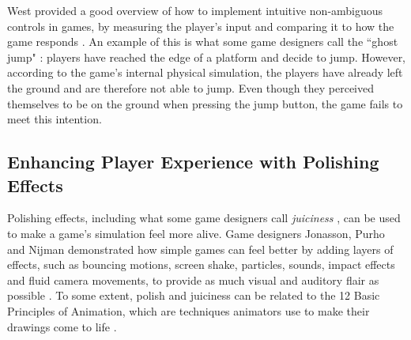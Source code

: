 
West provided a good overview of how to implement intuitive non-ambiguous controls in games, by measuring the player's input and comparing it to how the game responds \cite{intuitive_buttons}. An example of this is what some game designers call the ``ghost jump" \cite{ghostJump, canabalt}: players have reached the edge of a platform and decide to jump. However, according to the game's internal physical simulation, the players have already left the ground and are therefore not able to jump. Even though they perceived themselves to be on the ground when pressing the jump button, the game fails to meet this intention.

\subsection{Enhancing Player Experience with Polishing Effects} \label{polishSection}
Polishing effects, including what some game designers call \textit{juiciness} \cite{schell_art_2008}, can be used to make a game's simulation feel more alive. Game designers Jonasson, Purho and Nijman demonstrated how simple games can feel better by adding layers of effects, such as bouncing motions, screen shake, particles, sounds, impact effects and fluid camera movements, to provide as much visual and auditory flair as possible \cite{juice1, juice2}. To some extent, polish and juiciness can be related to the 12 Basic Principles of Animation, which are techniques animators use to make their drawings come to life \cite{animation}.

